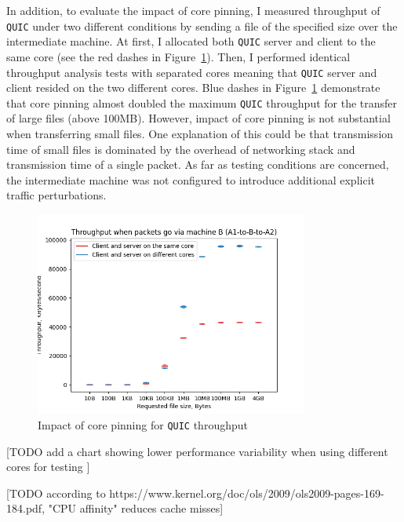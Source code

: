 \documentclass[12pt,a4paper,twoside,openright]{report}
\begin{document}
In addition, to evaluate the impact of core pinning, I measured throughput of \texttt{QUIC} under two different conditions by sending a file of the specified size over the intermediate machine.
At first, I allocated both \texttt{QUIC} server and client to the same core (see the red dashes in Figure~\ref{fig:Throughput_via_A-to-B-to-A_MTU=1500}).
Then, I performed identical throughput analysis tests with separated cores meaning that \texttt{QUIC} server and client resided on the two different cores.
Blue dashes in Figure~\ref{fig:Throughput_via_A-to-B-to-A_MTU=1500} demonstrate that core pinning almost doubled the maximum \texttt{QUIC} throughput for the transfer of large files (above 100MB).
However, impact of core pinning is not substantial when transferring small files.
One explanation of this could be that transmission time of small files is dominated by the overhead of networking stack and transmission time of a single packet.
As far as testing conditions are concerned, the intermediate machine was not configured to introduce additional explicit traffic perturbations.
    \begin{figure}[H]
    \centering
    \includegraphics[width=0.8\textwidth]{figs/Throughput via node B (A-to-B-to-A)_MTU=1500.png}
    \caption{Impact of core pinning for \texttt{QUIC} throughput}
    \label{fig:Throughput_via_A-to-B-to-A_MTU=1500}
    \end{figure}

[TODO add a chart showing lower performance variability when using different cores for testing ]

[TODO according to https://www.kernel.org/doc/ols/2009/ols2009-pages-169-184.pdf, "CPU affinity" reduces cache misses]
\end{document}
